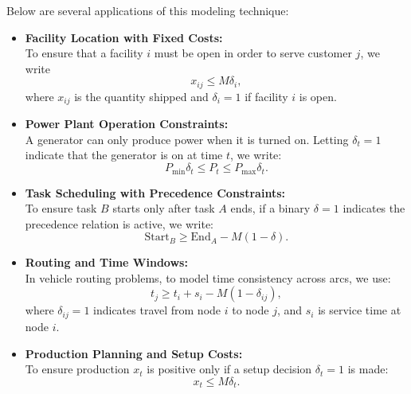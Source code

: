 Below are several applications of this modeling technique:

\begin{itemize}
  \item \textbf{Facility Location with Fixed Costs:}\\
  To ensure that a facility \(i\) must be open in order to serve customer \(j\), we write
  \[
  x_{ij} \le M \delta_i,
  \]
  where \(x_{ij}\) is the quantity shipped and \(\delta_i = 1\) if facility \(i\) is open.


  \item \textbf{Power Plant Operation Constraints:}\\
  A generator can only produce power when it is turned on. Letting \(\delta_t = 1\) indicate that the generator is on at time \(t\), we write:
  \[
  P_{\min} \delta_t \le P_t \le P_{\max} \delta_t.
  \]

  \item \textbf{Task Scheduling with Precedence Constraints:}\\
  To ensure task \(B\) starts only after task \(A\) ends, if a binary \(\delta = 1\) indicates the precedence relation is active, we write:
  \[
  \text{Start}_B \ge \text{End}_A - M(1 - \delta).
  \]

  \item \textbf{Routing and Time Windows:}\\
  In vehicle routing problems, to model time consistency across arcs, we use:
  \[
  t_j \ge t_i + s_i - M(1 - \delta_{ij}),
  \]
  where \(\delta_{ij} = 1\) indicates travel from node \(i\) to node \(j\), and \(s_i\) is service time at node \(i\).

  \item \textbf{Production Planning and Setup Costs:}\\
  To ensure production \(x_t\) is positive only if a setup decision \(\delta_t = 1\) is made:
  \[
  x_t \le M \delta_t.
  \]
\end{itemize}
\newpage

